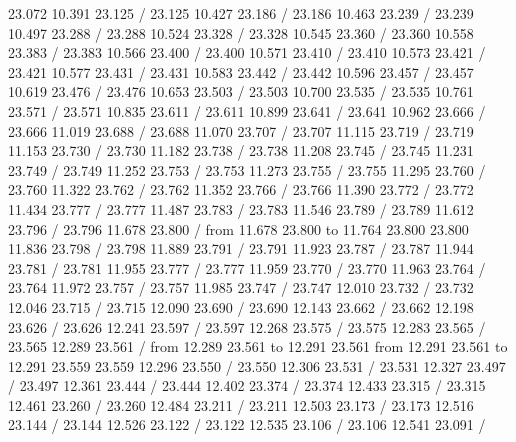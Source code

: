 {{ 23.072 10.391 23.125 /
 23.125 10.427 23.186 /
 23.186 10.463 23.239 /
 23.239 10.497 23.288 /
 23.288 10.524 23.328 /
 23.328 10.545 23.360 /
 23.360 10.558 23.383 /
 23.383 10.566 23.400 /
 23.400 10.571 23.410 /
 23.410 10.573 23.421 /
 23.421 10.577 23.431 /
 23.431 10.583 23.442 /
 23.442 10.596 23.457 /
 23.457 10.619 23.476 /
 23.476 10.653 23.503 /
 23.503 10.700 23.535 /
 23.535 10.761 23.571 /
 23.571 10.835 23.611 /
 23.611 10.899 23.641 /
 23.641 10.962 23.666 /
 23.666 11.019 23.688 /
 23.688 11.070 23.707 /
 23.707 11.115 23.719 /
 23.719 11.153 23.730 /
 23.730 11.182 23.738 /
 23.738 11.208 23.745 /
 23.745 11.231 23.749 /
 23.749 11.252 23.753 /
 23.753 11.273 23.755 /
 23.755 11.295 23.760 /
 23.760 11.322 23.762 /
 23.762 11.352 23.766 /
 23.766 11.390 23.772 /
 23.772 11.434 23.777 /
 23.777 11.487 23.783 /
 23.783 11.546 23.789 /
 23.789 11.612 23.796 /
 23.796 11.678 23.800 /
\putrule from 11.678 23.800 to 11.764 23.800
 23.800 11.836 23.798 /
 23.798 11.889 23.791 /
 23.791 11.923 23.787 /
 23.787 11.944 23.781 /
 23.781 11.955 23.777 /
 23.777 11.959 23.770 /
 23.770 11.963 23.764 /
 23.764 11.972 23.757 /
 23.757 11.985 23.747 /
 23.747 12.010 23.732 /
 23.732 12.046 23.715 /
 23.715 12.090 23.690 /
 23.690 12.143 23.662 /
 23.662 12.198 23.626 /
 23.626 12.241 23.597 /
 23.597 12.268 23.575 /
 23.575 12.283 23.565 /
 23.565 12.289 23.561 /
\putrule from 12.289 23.561 to 12.291 23.561
\putrule from 12.291 23.561 to 12.291 23.559
 23.559 12.296 23.550 /
 23.550 12.306 23.531 /
 23.531 12.327 23.497 /
 23.497 12.361 23.444 /
 23.444 12.402 23.374 /
 23.374 12.433 23.315 /
 23.315 12.461 23.260 /
 23.260 12.484 23.211 /
 23.211 12.503 23.173 /
 23.173 12.516 23.144 /
 23.144 12.526 23.122 /
 23.122 12.535 23.106 /
 23.106 12.541 23.091 /
}}
